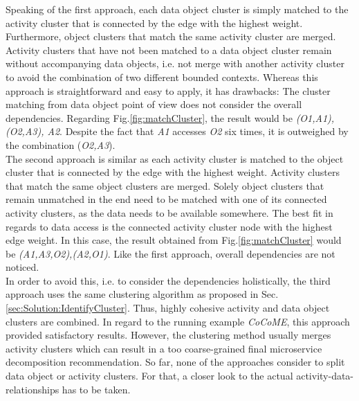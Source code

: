 \noindent
Speaking of the first approach, each data object cluster is simply matched to the activity cluster that is connected by the edge with the highest weight. Furthermore, object clusters that match the same activity cluster are merged. Activity clusters that have not been matched to a data object cluster remain without accompanying data objects, i.e. not merge with another activity cluster to avoid the combination of two different bounded contexts. Whereas this approach is straightforward and easy to apply, it has drawbacks: The cluster matching from data object point of view does not consider the overall dependencies. Regarding Fig.\ref{fig:matchCluster}, the result would be \textit{(O1,A1), (O2,A3), A2}. Despite the fact that \textit{A1} accesses \textit{O2} six times, it is outweighed by the combination (\textit{O2,A3}).  \\
The second approach is similar as each activity cluster is matched to the object cluster that is connected by the edge with the highest weight. Activity clusters that match the same object clusters are merged. Solely object clusters that remain unmatched in the end need to be matched with one of its connected activity clusters, as the data needs to be available somewhere. The best fit in regards to data access is the connected activity cluster node with the highest edge weight. In this case, the result obtained from Fig.\ref{fig:matchCluster} would be \textit{(A1,A3,O2),(A2,O1)}. Like the first approach, overall dependencies are not noticed. \\
In order to avoid this, i.e. to consider the dependencies holistically, the third approach uses the same clustering algorithm as proposed in Sec.\ref{sec:Solution:IdentifyCluster}. Thus, highly cohesive activity and data object clusters are combined. In regard to the running example \textit{CoCoME}, this approach provided satisfactory results. However, the clustering method usually merges activity clusters which can result in a too coarse-grained final microservice decomposition recommendation. So far, none of the approaches consider to split data object or activity clusters. For that, a closer look to the actual activity-data-relationships has to be taken. \\
